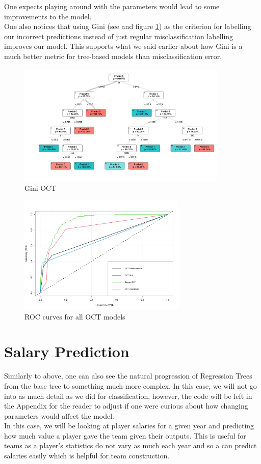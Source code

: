 \documentclass[11pt,a4paper]{report}
\begin{document}
One expects playing around with the parameters would lead to some improvements to the model.
\medskip\\
One also notices that using Gini (see \cite{oct} and figure \ref{fig:ginioct}) as the criterion for labelling our incorrect predictions instead of just regular misclassification labelling improves our model.
This supports what we said earlier about how Gini is a much better metric for tree-based models than misclassification error.
\begin{figure}
    \centering
    \includegraphics[width = 10cm]{reportcharts/ginioct.png}
    \caption{Gini OCT}
    \label{fig:ginioct}
\end{figure}
\begin{figure}
    \centering
    \includegraphics[width = 8cm]{reportcharts/alloctroc.pdf}
    \caption{ROC curves for all OCT models}
    \label{fig:allrococt}
\end{figure}




\section{Salary Prediction}
Similarly to above, one can also see the natural progression of Regression Trees from the base tree to something much more complex.
In this case, we will not go into as much detail as we did for classification, however, the code will be left in the Appendix for the reader to adjust if one were curious about how changing parameters would affect the model.
\medskip\\
In this case, we will be looking at player salaries for a given year and predicting how much value a player gave the team given their outputs.
This is useful for teams as a player's statistics do not vary as much each year and so a can predict salaries easily which is helpful for team construction. 
\end{document}
